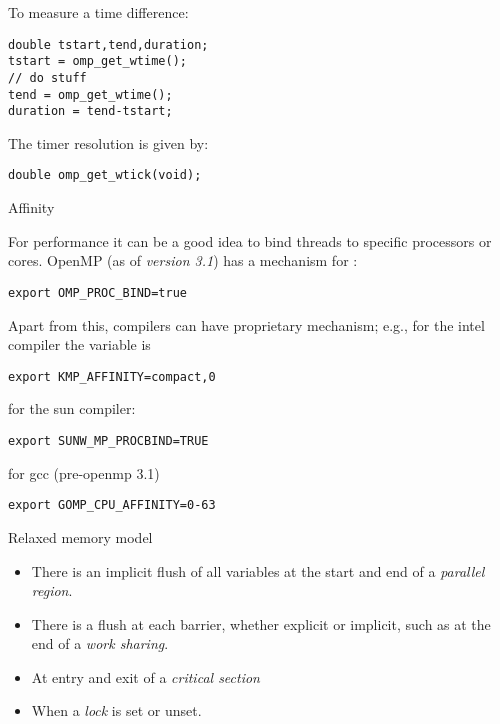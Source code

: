 To measure a time difference:
\begin{verbatim}
double tstart,tend,duration;
tstart = omp_get_wtime();
// do stuff
tend = omp_get_wtime();
duration = tend-tstart;
\end{verbatim}
The timer resolution is given by:
\begin{verbatim}
double omp_get_wtick(void);
\end{verbatim}

 {Affinity}

For performance it can be a good idea to bind threads to specific
processors or cores.  OpenMP (as of \emph{version 3.1}) has a
mechanism for :
\begin{verbatim}
export OMP_PROC_BIND=true  
\end{verbatim}
Apart from this, compilers can have proprietary mechanism; 
e.g., for the intel compiler the variable is
\begin{verbatim}
export KMP_AFFINITY=compact,0
\end{verbatim}
for the sun compiler:
\begin{verbatim}
export SUNW_MP_PROCBIND=TRUE
\end{verbatim}
for gcc (pre-openmp 3.1)
\begin{verbatim}
export GOMP_CPU_AFFINITY=0-63
\end{verbatim}

 {Relaxed memory model}
\label{sec:ref:omp:flush}


\begin{itemize}
\item There is an implicit flush of all variables at the start and end 
  of a \emph{parallel region}.
\item There is a flush at each barrier, whether explicit or implicit,
  such as at the end of a \emph{work sharing}.
\item At entry and exit of a \emph{critical section}
\item When a \emph{lock} is set or unset.
\end{itemize}

